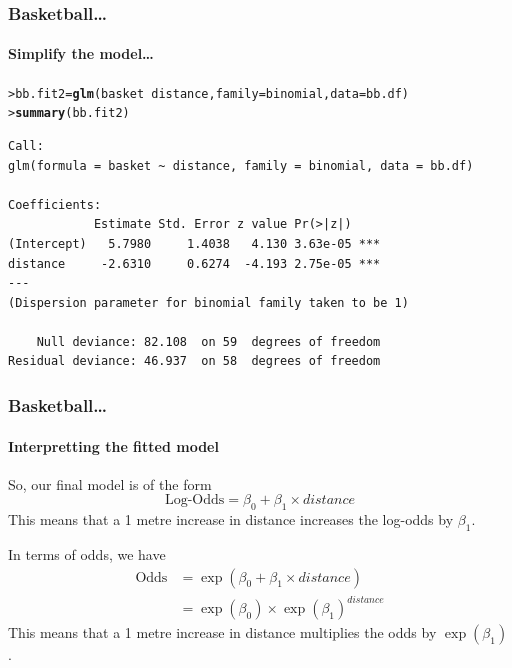 \documentclass{beamer}\usepackage[]{graphicx}\usepackage[]{xcolor}
\makeatletter
\newcommand{\hlopt}[1]{\textcolor[rgb]{0,0,0}{#1}}%
\newcommand{\hlstd}[1]{\textcolor[rgb]{0.345,0.345,0.345}{#1}}%
\newcommand{\hlkwb}[1]{\textcolor[rgb]{0.69,0.353,0.396}{#1}}%
\newcommand{\hlkwc}[1]{\textcolor[rgb]{0.333,0.667,0.333}{#1}}%
\newcommand{\hlkwd}[1]{\textcolor[rgb]{0.737,0.353,0.396}{\textbf{#1}}}%
\newenvironment{kframe}{%
 \def\at@end@of@kframe{}%
 \ifinner\ifhmode%
  \def\at@end@of@kframe{\end{minipage}}%
  \begin{minipage}{\columnwidth}%
 \fi\fi%
 \def\FrameCommand##1{\hskip\@totalleftmargin \hskip-\fboxsep
 \colorbox{shadecolor}{##1}\hskip-\fboxsep
     \hskip-\linewidth \hskip-\@totalleftmargin \hskip\columnwidth}%
 \MakeFramed {\advance\hsize-\width
   \@totalleftmargin\z@ \linewidth\hsize
   \@setminipage}}%
 {\par\unskip\endMakeFramed%
 \at@end@of@kframe}
\newenvironment{knitrout}{}{} %
\makeatother
\begin{document}
\begin{frame}[fragile]
\frametitle{Basketball\ldots}
\framesubtitle{Simplify the model\ldots}
\begin{knitrout}\scriptsize
{}\color{fgcolor}\begin{kframe}
\begin{alltt}
\hlstd{> }\hlstd{bb.fit2} \hlkwb{=} \hlkwd{glm}\hlstd{(basket} \hlopt{~} \hlstd{distance,} \hlkwc{family} \hlstd{= binomial,} \hlkwc{data} \hlstd{= bb.df)}
\hlstd{> }\hlkwd{summary}\hlstd{(bb.fit2)}
\end{alltt}
\end{kframe}
\end{knitrout}

\begin{knitrout}\scriptsize
{}\color{fgcolor}\begin{kframe}
\begin{verbatim}
Call:
glm(formula = basket ~ distance, family = binomial, data = bb.df)

Coefficients:
            Estimate Std. Error z value Pr(>|z|)    
(Intercept)   5.7980     1.4038   4.130 3.63e-05 ***
distance     -2.6310     0.6274  -4.193 2.75e-05 ***
---
(Dispersion parameter for binomial family taken to be 1)

    Null deviance: 82.108  on 59  degrees of freedom
Residual deviance: 46.937  on 58  degrees of freedom
\end{verbatim}
\end{kframe}
\end{knitrout}
\end{frame}



\begin{frame}[fragile]
\frametitle{Basketball\ldots}
\framesubtitle{Interpretting the fitted model}
\label{pg:Odds}
So, our final model is of the form
\[ \text{Log-Odds} = \beta_0 + \beta_1 \times distance \] 
This means that a 1 metre increase in distance increases the log-odds by $\beta_1$.
\bigskip

In terms of odds, we have
\[ 
\begin{split}
\text{Odds} &= \exp( \beta_0 + \beta_1 \times distance) \\
            &= \exp(\beta_0) \times \exp(\beta_1)^{distance} 
\end{split}
\] 
This means that a 1 metre increase in distance multiplies the odds by $\exp(\beta_1) $.           
\end{frame}
\end{document}
